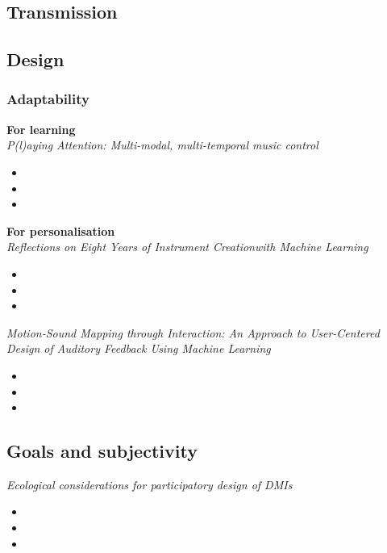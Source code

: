 \documentclass[11pt]{article}
\begin{document}
\subsection{Transmission}



\subsection{Design}
\subsubsection{Adaptability}
\textbf{For learning}\\
\textit{P(l)aying Attention: Multi-modal, multi-temporal music control} \citep{gold_playing_2020}
\begin{itemize}
    \item 
    \item 
    \item 
\end{itemize}

\textbf{For personalisation}\\
\textit{Reflections on Eight Years of Instrument Creationwith Machine Learning} \citep{fiebrink_reflections_2020}
\begin{itemize}
    \item 
    \item 
    \item 
\end{itemize}

\textit{Motion-Sound Mapping through Interaction: An Approach to User-Centered Design of Auditory Feedback Using Machine Learning} \citep{francoise_motion-sound_2018}
\begin{itemize}
    \item 
    \item 
    \item 
\end{itemize}

\subsection{Goals and subjectivity}
\textit{Ecological considerations for participatory design of DMIs} \citep{fyans_ecological_2012}
\begin{itemize}
    \item 
    \item 
    \item 
\end{itemize}
\end{document}
